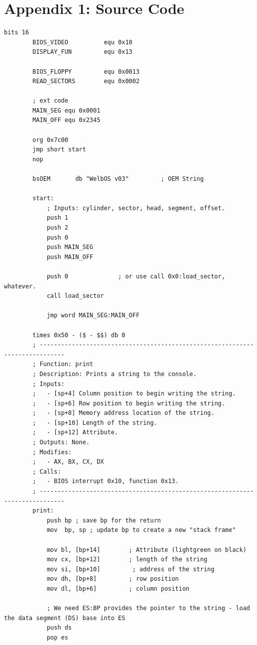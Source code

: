 \documentclass{article}
\begin{document}
    \section{Appendix 1: Source Code}\label{sec:appendix_1}

    \begin{lstlisting}[caption={os623V03.asm listing}, captionpos=t]
        bits 16
        BIOS_VIDEO          equ 0x10
        DISPLAY_FUN         equ 0x13

        BIOS_FLOPPY         equ 0x0013
        READ_SECTORS        equ 0x0002

        ; ext code
        MAIN_SEG equ 0x0001
        MAIN_OFF equ 0x2345

        org 0x7c00
        jmp short start
        nop

        bsOEM       db "WelbOS v03"         ; OEM String

        start:
            ; Inputs: cylinder, sector, head, segment, offset.
            push 1
            push 2
            push 0
            push MAIN_SEG
            push MAIN_OFF

            push 0              ; or use call 0x0:load_sector, whatever.
            call load_sector

            jmp word MAIN_SEG:MAIN_OFF

        times 0x50 - ($ - $$) db 0
        ; -----------------------------------------------------------------------------
        ; Function: print
        ; Description: Prints a string to the console.
        ; Inputs:
        ;   - [sp+4] Column position to begin writing the string.
        ;   - [sp+6] Row position to begin writing the string.
        ;   - [sp+8] Memory address location of the string.
        ;   - [sp+10] Length of the string.
        ;   - [sp+12] Attribute.
        ; Outputs: None.
        ; Modifies:
        ;   - AX, BX, CX, DX
        ; Calls:
        ;   - BIOS interrupt 0x10, function 0x13.
        ; -----------------------------------------------------------------------------
        print:
            push bp ; save bp for the return
            mov  bp, sp ; update bp to create a new "stack frame"

            mov bl, [bp+14]        ; Attribute (lightgreen on black)
            mov cx, [bp+12]        ; length of the string
            mov si, [bp+10]         ; address of the string
            mov dh, [bp+8]         ; row position
            mov dl, [bp+6]         ; column position

            ; We need ES:BP provides the pointer to the string - load the data segment (DS) base into ES
            push ds
            pop es


\end{lstlisting}
\end{document}
